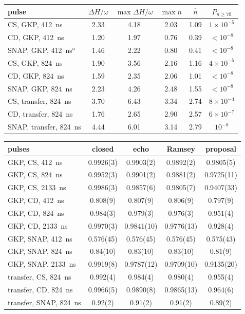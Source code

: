 \begin{ruledtabular}
\begin{ruledtabular}
\label{tab:resources}
\begin{ruledtabular}
\begin{tabular}{lccccc}
pulse & $\overline{\Delta H}/\omega$ & $\max\Delta H/\omega$ & $\max\bar n$ & $\overline{\bar n}$ & $P_{n\geq70}$\\\hline
CS, GKP, 412~ns & 2.33 & 4.18 & 2.03 & 1.09 & $1\times10^{-5}$\\
CD, GKP, 412~ns & 1.20 & 1.97 & 0.76 & 0.39 & $<10^{-8}$\\
SNAP, GKP, 412~ns$^a$ & 1.46 & 2.22 & 0.80 & 0.41 & $<10^{-8}$\\
CS, GKP, 824~ns & 1.90 & 3.56 & 2.16 & 1.16 & $4\times10^{-5}$\\
CD, GKP, 824~ns & 1.59 & 2.35 & 2.06 & 1.01 & $<10^{-8}$\\
SNAP, GKP, 824~ns & 2.23 & 4.26 & 2.48 & 1.55 & $<10^{-8}$\\
CS, transfer, 824~ns & 3.70 & 6.43 & 3.34 & 2.74 & $8\times10^{-4}$\\
CD, transfer, 824~ns & 1.76 & 2.65 & 2.90 & 2.57 & $6\times10^{-7}$\\
SNAP, transfer, 824~ns & 4.44 & 6.01 & 3.14 & 2.79 & $10^{-8}$\\
\end{tabular}

\label{tab:proposal}
\begin{ruledtabular}
\begin{tabular}{lcccc}
pulses & closed & echo & Ramsey & proposal\\\hline
GKP, CS, 412~ns & 0.9926(3) & 0.9903(2) & 0.9892(2) & 0.9805(5)\\
GKP, CS, 824~ns & 0.9952(3) & 0.9901(2) & 0.9881(2) & 0.9725(11)\\
GKP, CS, 2133~ns & 0.9986(3) & 0.9857(6) & 0.9805(7) & 0.9407(33)\\
GKP, CD, 412~ns & 0.808(9) & 0.807(9) & 0.806(9) & 0.797(9)\\
GKP, CD, 824~ns & 0.984(3) & 0.979(3) & 0.976(3) & 0.951(4)\\
GKP, CD, 2133~ns & 0.9970(3) & 0.9841(10) & 0.9776(13) & 0.928(4)\\
GKP, SNAP, 412~ns & 0.576(45) & 0.576(45) & 0.576(45) & 0.575(43)\\
GKP, SNAP, 824~ns & 0.84(10) & 0.83(10) & 0.83(10) & 0.81(9)\\
GKP, SNAP, 2133~ns & 0.9919(8) & 0.9787(12) & 0.9709(10) & 0.9135(20)\\
transfer, CS, 824~ns & 0.992(4) & 0.984(4) & 0.980(4) & 0.955(4)\\
transfer, CD, 824~ns & 0.9966(5) & 0.9890(8) & 0.9865(13) & 0.964(6)\\
transfer, SNAP, 824~ns & 0.92(2) & 0.91(2) & 0.91(2) & 0.89(2)\\
\end{tabular}


\end{ruledtabular}
\end{ruledtabular}
\end{ruledtabular}
\end{ruledtabular}
